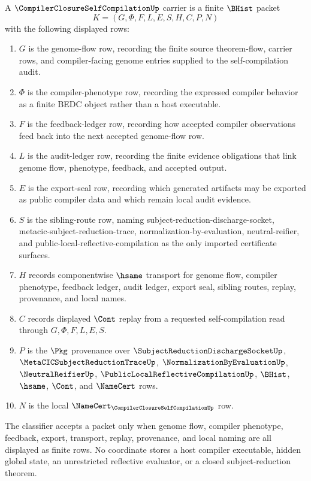 \begin{definition}
\label{def:compiler-closure-self-compilation-carrier}
A $\CompilerClosureSelfCompilationUp$ carrier is a finite $\BHist$ packet
$$
K=(G,\Phi,F,L,E,S,H,C,P,N)
$$
with the following displayed rows:
\begin{enumerate}
\item $G$ is the genome-flow row, recording the finite source theorem-flow, carrier rows, and compiler-facing genome entries supplied to the self-compilation audit.
\item $\Phi$ is the compiler-phenotype row, recording the expressed compiler behavior as a finite BEDC object rather than a host executable.
\item $F$ is the feedback-ledger row, recording how accepted compiler observations feed back into the next accepted genome-flow row.
\item $L$ is the audit-ledger row, recording the finite evidence obligations that link genome flow, phenotype, feedback, and accepted output.
\item $E$ is the export-seal row, recording which generated artifacts may be exported as public compiler data and which remain local audit evidence.
\item $S$ is the sibling-route row, naming subject-reduction-discharge-socket, metacic-subject-reduction-trace, normalization-by-evaluation, neutral-reifier, and public-local-reflective-compilation as the only imported certificate surfaces.
\item $H$ records componentwise $\hsame$ transport for genome flow, compiler phenotype, feedback ledger, audit ledger, export seal, sibling routes, replay, provenance, and local names.
\item $C$ records displayed $\Cont$ replay from a requested self-compilation read through $G,\Phi,F,L,E,S$.
\item $P$ is the $\Pkg$ provenance over $\SubjectReductionDischargeSocketUp$, $\MetaCICSubjectReductionTraceUp$, $\NormalizationByEvaluationUp$, $\NeutralReifierUp$, $\PublicLocalReflectiveCompilationUp$, $\BHist$, $\hsame$, $\Cont$, and $\NameCert$ rows.
\item $N$ is the local $\NameCert_{\CompilerClosureSelfCompilationUp}$ row.
\end{enumerate}
The classifier accepts a packet only when genome flow, compiler phenotype, feedback, export, transport, replay, provenance, and local naming are all displayed as finite rows. No coordinate stores a host compiler executable, hidden global state, an unrestricted reflective evaluator, or a closed subject-reduction theorem.
\end{definition}

